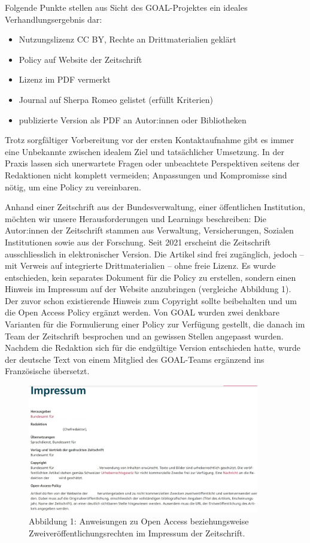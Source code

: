 \documentclass[a4paper,
fontsize=11pt,
oneside,
numbers=noperiodatend,
parskip=half-,
bibliography=totoc,
final
]{scrartcl}
\begin{document}
\pagebreak
Folgende Punkte stellen aus Sicht des GOAL-Projektes ein ideales
Verhandlungsergebnis dar:

\begin{itemize}
\item
  Nutzungslizenz CC BY, Rechte an Drittmaterialien geklärt
\item
  Policy auf Website der Zeitschrift
\item
  Lizenz im PDF vermerkt
\item
  Journal auf Sherpa Romeo gelistet (erfüllt Kriterien)
\item
  publizierte Version als PDF an Autor:innen oder Bibliotheken
\end{itemize}

Trotz sorgfältiger Vorbereitung vor der ersten Kontaktaufnahme gibt es
immer eine Unbekannte zwischen idealem Ziel und tatsächlicher Umsetzung.
In der Praxis lassen sich unerwartete Fragen oder unbeachtete
Perspektiven seitens der Redaktionen nicht komplett vermeiden;
Anpassungen und Kompromisse sind nötig, um eine Policy zu vereinbaren.

Anhand einer Zeitschrift aus der Bundesverwaltung, einer öffentlichen
Institution, möchten wir unsere Herausforderungen und Learnings
beschreiben: Die Autor:innen der Zeitschrift stammen aus Verwaltung,
Versicherungen, Sozialen Institutionen sowie aus der Forschung. Seit
2021 erscheint die Zeitschrift ausschliesslich in elektronischer
Version. Die Artikel sind frei zugänglich, jedoch -- mit Verweis auf
integrierte Drittmaterialien -- ohne freie Lizenz. Es wurde entschieden,
kein separates Dokument für die Policy zu erstellen, sondern einen
Hinweis im Impressum auf der Website anzubringen (vergleiche Abbildung
1). Der zuvor schon existierende Hinweis zum Copyright sollte
beibehalten und um die Open Access Policy ergänzt werden. Von GOAL
wurden zwei denkbare Varianten für die Formulierung einer Policy zur
Verfügung gestellt, die danach im Team der Zeitschrift besprochen und an
gewissen Stellen angepasst wurden. Nachdem die Redaktion sich für die
endgültige Version entschieden hatte, wurde der deutsche Text von einem
Mitglied des GOAL-Teams ergänzend ins Französische übersetzt.

\begin{figure}[h!]
\centering
\includegraphics[width=0.9\textwidth]{img/andres_corredera_abb1.jpg}
\caption{Abbildung 1: Anweisungen zu Open Access beziehungsweise
Zweiveröffentlichungsrechten im Impressum der Zeitschrift.}
\end{figure}
\end{document}
